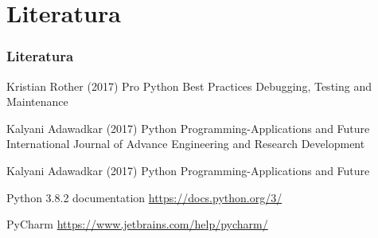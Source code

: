 \documentclass{beamer}
\begin{document}
\section{Literatura}
\begin{frame}
\frametitle{Literatura}
\footnotesize{
\begin{thebibliography}{} %
 Kristian Rother (2017)
\newblock Pro Python Best Practices Debugging, Testing and Maintenance

 Kalyani Adawadkar (2017)
\newblock Python Programming-Applications and Future
\newblock International Journal of Advance Engineering and Research Development

 Kalyani Adawadkar (2017)
\newblock Python Programming-Applications and Future


 Python 3.8.2 documentation
\newblock \url{https://docs.python.org/3/}

 PyCharm
\newblock \url{https://www.jetbrains.com/help/pycharm/}
\end{thebibliography}
}

\end{frame}



\end{document}
